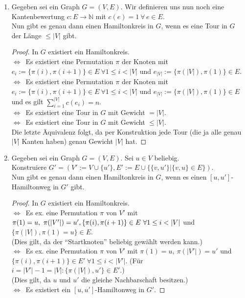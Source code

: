 \documentclass[a4paper,10pt,german]{scrartcl}
\newcommand{\gdw}{\ensuremath{\Leftrightarrow}}
\newcommand{\N}{\ensuremath{\mathbb{N}}}
\begin{document}
\begin{enumerate}
 \item Gegeben sei ein Graph $G=(V,E)$. Wir definieren uns nun noch eine Kantenbewertung $c:E\to \N$ mit $c(e)=1\ \forall\,e\in E$.\\
 Nun gibt es genau dann einen Hamiltonkreis in $G$, wenn es eine Tour in $G$ der Länge $\leq |V|$ gibt.
 \begin{proof}
   In $G$ existiert ein Hamiltonkreis.\\
   \gdw\ Es existiert eine Permutation $\pi$ der Knoten mit $e_i:=\{\pi(i),\pi(i+1)\}\in E\ \forall 1\leq i< |V|$ und $e_{|V|}:=\{\pi(|V|),\pi(1)\}\in E$.\\
   \gdw\ Es existiert eine Permutation $\pi$ der Knoten mit $e_i:=\{\pi(i),\pi(i+1)\}\in E\ \forall 1\leq i< |V|$ und $e_{|V|}:=\{\pi(|V|),\pi(1)\}\in E$ und es gilt $\sum\limits_{i=1}^{|V|}c(e_i)=n$.\\
   \gdw\ Es existiert eine Tour in $G$ mit Gewicht $=|V|$.\\
   \gdw\ Es existiert eine Tour in $G$ mit Gewicht $\leq|V|$.\\
   Die letzte Äquivalenz folgt, da per Konstruktion jede Tour (die ja alle genau $|V|$ Kanten haben) genau Gewicht $|V|$ hat.
 \end{proof}
 \item Gegeben sei ein Graph $G=(V,E)$. Sei $u\in V$ beliebig.\\
 Konstruiere $G'=(V':=V\cup\{u'\},E':=E\cup\{\{v,u'\}|\{v,u\}\in E\})$.\\
 Nun gibt es genau dann einen Hamiltonkreis in $G$, wenn es einen $[u,u']$-Hamiltonweg in $G'$ gibt.
 \begin{proof}
   In $G$ existiert ein Hamiltonkreis.\\
   \gdw\ Es ex. eine Permutation $\pi$ von $V'$ mit $\pi(1)=u,\ \pi(|V'|)=u',\\ \{\pi(i),\pi(i+1)\}\in E\ \forall 1\leq i< |V|$ und $\{\pi(|V|),\pi(1)=u\}\in E$.\\
   (Dies gilt, da der ``Startknoten'' beliebig gewählt werden kann.)\\
   \gdw\ Es ex. eine Permutation $\pi$ von $V'$ mit $\pi(1)=u,\ \pi(|V'|)=u'$ und \\$\{\pi(i),\pi(i+1)\}\in E'\ \forall 1\leq i< |V'|$. (Für $i=|V'|-1=|V|:\{\pi(|V|),u'\}\in E'$.)\\
   (Dies gilt, da $u$ und $u'$ die gleiche Nachbarschaft besitzen.)\\
   \gdw\ Es existiert ein $[u,u']$-Hamiltonweg  in $G'$.

\end{proof}
\end{enumerate}
\end{document}
